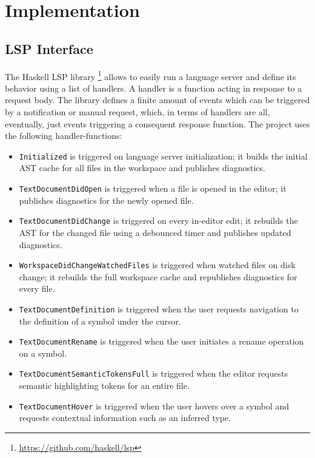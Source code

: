 \chapter{Implementation}
\label{chap:impl}

\section{LSP Interface}

The Haskell LSP library \footnote{\url{https://github.com/haskell/lsp}} allows to easily run a language server and define its behavior using a list of handlers. 
A handler is a function acting in response to a request body.
The library defines a finite amount of events which can be triggered by a notification or manual request, which, in terms of handlers are all, eventually, just events triggering a consequent response function.
The project uses the following handler-functions:

\begin{itemize}
\item \texttt{Initialized} is triggered on language server initialization; it builds the initial AST cache for all files in the workspace and publishes diagnostics.
\item \texttt{TextDocumentDidOpen} is triggered when a file is opened in the editor; it publishes diagnostics for the newly opened file.
\item \texttt{TextDocumentDidChange} is triggered on every in-editor edit; it rebuilds the AST for the changed file using a debounced timer and publishes updated diagnostics.
\item \texttt{WorkspaceDidChangeWatchedFiles} is triggered when watched files on disk change; it rebuilds the full workspace cache and republishes diagnostics for every file.
\item \texttt{TextDocumentDefinition} is triggered when the user requests navigation to the definition of a symbol under the cursor.
\item \texttt{TextDocumentRename} is triggered when the user initiates a rename operation on a symbol.
\item \texttt{TextDocumentSemanticTokensFull} is triggered when the editor requests semantic highlighting tokens for an entire file.
\item \texttt{TextDocumentHover} is triggered when the user hovers over a symbol and requests contextual information such as an inferred type.
\end{itemize}

